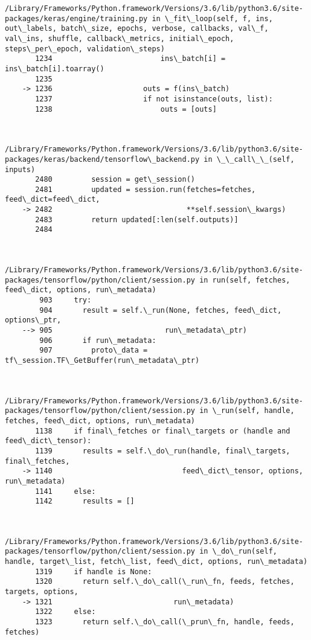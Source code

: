 \documentclass[11pt]{article}
\begin{document}
\begin{Verbatim}[commandchars=\\\{\}]
        /Library/Frameworks/Python.framework/Versions/3.6/lib/python3.6/site-packages/keras/engine/training.py in \_fit\_loop(self, f, ins, out\_labels, batch\_size, epochs, verbose, callbacks, val\_f, val\_ins, shuffle, callback\_metrics, initial\_epoch, steps\_per\_epoch, validation\_steps)
       1234                         ins\_batch[i] = ins\_batch[i].toarray()
       1235 
    -> 1236                     outs = f(ins\_batch)
       1237                     if not isinstance(outs, list):
       1238                         outs = [outs]


        /Library/Frameworks/Python.framework/Versions/3.6/lib/python3.6/site-packages/keras/backend/tensorflow\_backend.py in \_\_call\_\_(self, inputs)
       2480         session = get\_session()
       2481         updated = session.run(fetches=fetches, feed\_dict=feed\_dict,
    -> 2482                               **self.session\_kwargs)
       2483         return updated[:len(self.outputs)]
       2484 


        /Library/Frameworks/Python.framework/Versions/3.6/lib/python3.6/site-packages/tensorflow/python/client/session.py in run(self, fetches, feed\_dict, options, run\_metadata)
        903     try:
        904       result = self.\_run(None, fetches, feed\_dict, options\_ptr,
    --> 905                          run\_metadata\_ptr)
        906       if run\_metadata:
        907         proto\_data = tf\_session.TF\_GetBuffer(run\_metadata\_ptr)


        /Library/Frameworks/Python.framework/Versions/3.6/lib/python3.6/site-packages/tensorflow/python/client/session.py in \_run(self, handle, fetches, feed\_dict, options, run\_metadata)
       1138     if final\_fetches or final\_targets or (handle and feed\_dict\_tensor):
       1139       results = self.\_do\_run(handle, final\_targets, final\_fetches,
    -> 1140                              feed\_dict\_tensor, options, run\_metadata)
       1141     else:
       1142       results = []


        /Library/Frameworks/Python.framework/Versions/3.6/lib/python3.6/site-packages/tensorflow/python/client/session.py in \_do\_run(self, handle, target\_list, fetch\_list, feed\_dict, options, run\_metadata)
       1319     if handle is None:
       1320       return self.\_do\_call(\_run\_fn, feeds, fetches, targets, options,
    -> 1321                            run\_metadata)
       1322     else:
       1323       return self.\_do\_call(\_prun\_fn, handle, feeds, fetches)



\end{Verbatim}
\end{document}
